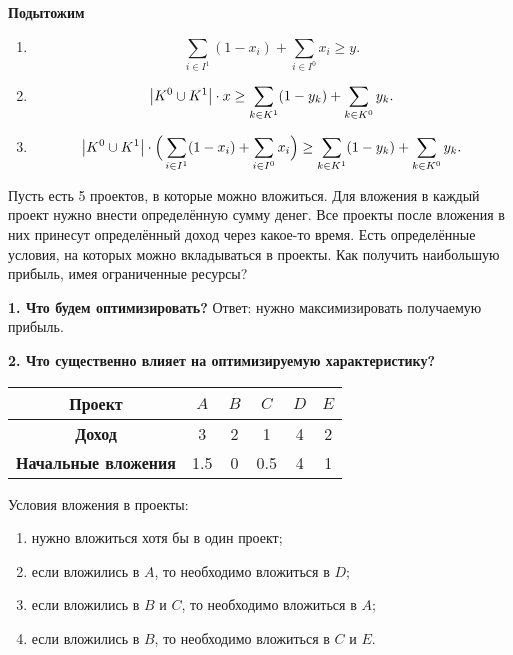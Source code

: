 \textbf{Подытожим}
\begin{enumerate}
	\item {}
	\[
	\sum_{i \in I^1}(1-x_i) + \sum_{i \in I^0}x_i \ge y.
	\]
	
	\item {}
	\[
	\abs{K^0 \cup K^1} \cdot x  \ge \sum_{k \in K^1}(1-y_k) + \sum_{k \in K^0}y_k.
	\]
	
	\item {}
	\[
	\abs{K^0 \cup K^1} \cdot \Big(\sum_{i \in I^1}(1-x_i) + \sum_{i \in I^0}x_i\Big) \ge \sum_{k \in K^1}(1-y_k) + \sum_{k \in K^0}y_k.
	\]
\end{enumerate}

\problem

Пусть есть 5 проектов, в которые можно вложиться. Для вложения в каждый проект нужно внести определённую сумму денег. Все проекты после вложения в них принесут определённый доход через какое-то время. Есть определённые условия, на которых можно вкладываться в проекты. Как получить наибольшую прибыль, имея ограниченные ресурсы?

\textbf{1. Что будем оптимизировать?} Ответ: нужно максимизировать получаемую прибыль.

\textbf{2. Что существенно влияет на оптимизируемую характеристику?}

\begin{table}[h!]
	\centering
	\begin{tabular}{| c | c | c | c | c | c |} 
		\hline
		\textbf{Проект}             & $A$ & $B$ & $C$ & $D$ & $E$ \\\hline
		\textbf{Доход}              & 3   & 2   & 1   & 4   & 2 \\\hline
		\textbf{Начальные вложения} & 1.5 & 0   & 0.5 & 4   & 1 \\\hline
	\end{tabular}
\end{table}

Условия вложения в проекты:
\begin{enumerate}[nosep]
	\item нужно вложиться хотя бы в один проект;
	
	\item если вложились в $A$, то необходимо вложиться в $D$;
	
	\item если вложились в $B$ и $C$, то необходимо вложиться в $A$;
	
	\item если вложились в $B$, то необходимо вложиться в $C$ и $E$.
\end{enumerate}

